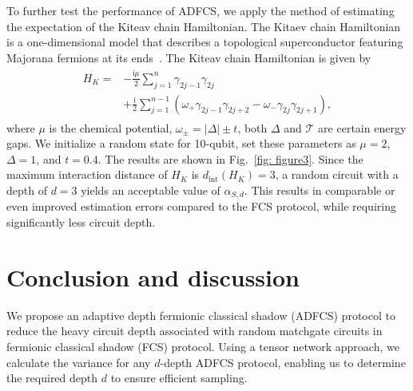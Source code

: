 \documentclass[journal=jctcce,a4paper,manuscript=article]{achemso}
\newcommand{\ii}{\mathsf{i}}
\newcommand{\Tcal}{\mathcal{T}}
\newcommand{\Mbb}{\mathbb{M}}
\begin{document}
To further test the performance of ADFCS, we apply the method of estimating the
expectation of the Kiteav chain Hamiltonian. The Kitaev chain Hamiltonian is a
one-dimensional model that describes a topological superconductor featuring
Majorana fermions at its ends~\cite{kitaev2001unpaired}. The Kiteav chain
Hamiltonian is given by
\begin{align}
  \begin{aligned}
    H_K = & -\frac{\ii \mu}{2} \sum_{j=1}^n \gamma_{2j-1}\gamma_{2j}                                                                \\
          & + \frac{\ii}{2}\sum_{j=1}^{n-1} \left( \omega_+ \gamma_{2j-1}\gamma_{2j+2} - \omega_- \gamma_{2j}\gamma_{2j+1} \right),
  \end{aligned}
\end{align}
where $\mu$ is the chemical potential, $\omega_{ \pm}=|\Delta| \pm t$, both $\Delta$ and $\Tcal$ are certain energy gaps. We initialize a random state for 10-qubit, set these parameters as $\mu = 2 $, $\Delta = 1$, and $t=0.4$. The results are shown in Fig.~\ref{fig: figure3}. Since the maximum interaction distance of $H_K$ is $d_\text{int}(H_K) = 3$, a random circuit with a depth of $d = 3$ yields an acceptable value of $\alpha_{S,d}$. This results in comparable or even improved estimation errors compared to the FCS protocol, while requiring significantly less circuit depth.

\section{Conclusion and discussion}
\label{sec: conclusion}
We propose an adaptive depth fermionic classical shadow (ADFCS) protocol to
reduce the heavy circuit depth associated with random matchgate circuits in
fermionic classical shadow (FCS) protocol. Using a tensor network approach, we
calculate the variance for any $d$-depth ADFCS protocol, enabling us to
determine the required depth $d$ to ensure efficient sampling.
\end{document}
